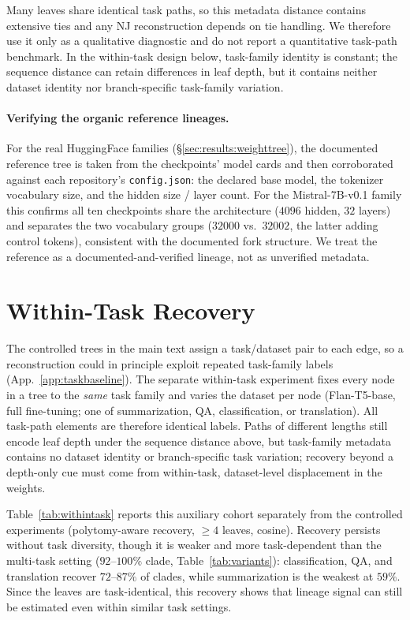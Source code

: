 \documentclass{article}
\theoremstyle{definition}
\theoremstyle{plain}
\begin{document}
Many leaves share identical task paths, so this metadata distance contains extensive ties and any NJ
reconstruction depends on tie handling. We therefore use it only as a qualitative diagnostic and do
not report a quantitative task-path benchmark. In the within-task design below, task-family identity is
constant; the sequence distance can retain differences in leaf depth, but it contains neither dataset
identity nor branch-specific task-family variation.

\paragraph{Verifying the organic reference lineages.} For the real HuggingFace families
(\S\ref{sec:results:weighttree}), the documented reference tree is taken from the checkpoints' model cards and
then corroborated against each repository's \texttt{config.json}: the declared base model, the tokenizer
vocabulary size, and the hidden size / layer count. For the Mistral-7B-v0.1 family this confirms all ten
checkpoints share the architecture ($4096$ hidden, $32$ layers) and separates the two vocabulary groups
($32000$ vs.\ $32002$, the latter adding control tokens), consistent with the documented fork structure.
We treat the reference as a documented-and-verified lineage, not as unverified metadata.


\section{Within-Task Recovery}
\label{app:withintask}

The controlled trees in the main text assign a task/dataset pair to each edge, so a reconstruction
could in principle exploit repeated task-family labels (App.~\ref{app:taskbaseline}). The separate
within-task experiment fixes every node in a tree to the \emph{same} task family and
varies the dataset per node (Flan-T5-base, full fine-tuning; one of summarization, QA, classification, or
translation). All task-path elements are therefore identical labels. Paths of different lengths still
encode leaf depth under the sequence distance above, but task-family metadata contains no dataset
identity or branch-specific task variation; recovery beyond a depth-only cue must come from
within-task, dataset-level displacement in the weights.

Table~\ref{tab:withintask} reports this auxiliary cohort separately from the controlled
experiments (polytomy-aware recovery, $\geq 4$ leaves, cosine). Recovery persists
without task diversity, though it is weaker and more task-dependent than the multi-task setting
($92$--$100\%$ clade, Table~\ref{tab:variants}): classification, QA, and translation recover $72$--$87\%$
of clades, while summarization is the weakest at $59\%$.
Since the leaves are task-identical, this recovery shows that lineage signal can still be estimated even within similar task settings.
\end{document}
